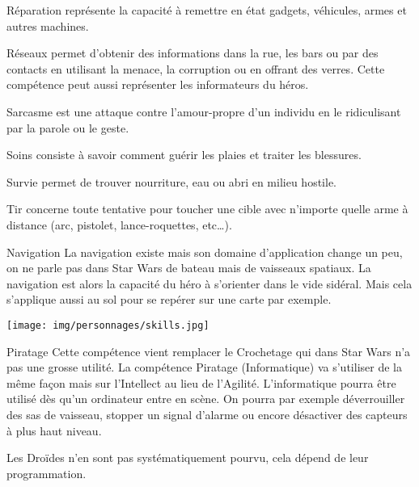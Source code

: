 \begin{description}[align=left]
    \item [Réparation (Int)]
        Réparation représente la capacité à remettre en état gadgets, véhicules, armes et autres machines.

    \item [Réseaux (Int)]
        Réseaux permet d’obtenir des informations dans la rue, les bars ou par des contacts en utilisant la menace, la corruption ou en offrant des verres. Cette compétence peut aussi représenter les informateurs du héros.

    \item [Sarcasme (Int)]
        Sarcasme est une attaque contre l’amour-propre d’un individu en le ridiculisant par la parole ou le geste.

    \item [Soins (Int)]
        Soins consiste à savoir comment guérir les plaies et traiter les blessures.

    \item [Survie (Int)]
        Survie permet de trouver nourriture, eau ou abri en milieu hostile.

    \item [Tir (Agi)]
        Tir concerne toute tentative pour toucher une cible avec n’importe quelle arme à distance (arc, pistolet, lance-roquettes, etc\ldots).
\end{description}
\clearpage
\begin{paperbox}{Navigation}
    La navigation existe mais son domaine d’application change un peu, on ne parle pas dans Star Wars de bateau mais de vaisseaux spatiaux. La navigation est alors la capacité du héro à s’orienter dans le vide sidéral. Mais cela s’applique aussi au sol pour se repérer sur une carte par exemple.
\end{paperbox}

\vspace*{\fill}
\hspace*{-0.5\columnsep}
\texttt{[image: img/personnages/skills.jpg]}

\newpage
\begin{paperbox}{Piratage}
    Cette compétence vient remplacer le Crochetage qui dans Star Wars n’a pas une grosse utilité. La compétence Piratage (Informatique) va s’utiliser de la même façon mais sur l’Intellect au lieu de l’Agilité. L’informatique pourra être utilisé dès qu’un ordinateur entre en scène. On pourra par exemple déverrouiller des sas de vaisseau, stopper un signal d’alarme ou encore désactiver des capteurs à plus haut niveau.

    Les Droïdes n’en sont pas systématiquement pourvu, cela dépend de leur programmation.
\end{paperbox}
